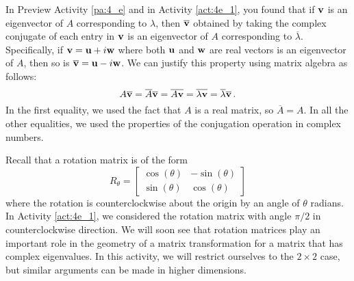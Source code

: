 In Preview Activity \ref{pa:4_e} and in Activity \ref{act:4e_1}, you found that if $\mathbf{v}$ is an eigenvector of $A$ corresponding to $\lambda$, then $\overline{\mathbf{v}}$ obtained by taking the complex conjugate of each entry in $\mathbf{v}$ is an eigenvector of $A$ corresponding to $\overline{\lambda}$. Specifically, if $\mathbf{v}=\mathbf{u}+i\mathbf{w}$ where both $\mathbf{u}$ and $\mathbf{w}$ are real vectors is an eigenvector of $A$, then so is $\overline{\mathbf{v}} = \mathbf{u}-i\mathbf{w}$. We can justify this property using matrix algebra as follows:
\[ A\overline{\mathbf{v}} = \overline{A}\overline{\mathbf{v}} = \overline{A\mathbf{v}} = \overline{\lambda \mathbf{v}} = \overline{\lambda} \overline{\mathbf{v}} \, .\]
In the first equality, we used the fact that $A$ is a real matrix, so $\overline{A}=A$. In all the other equalities, we used the properties of the conjugation operation in complex numbers.


Recall that a rotation matrix is of the form 
\[ R_\theta= \left[ \begin{array}{cr} \cos(\theta)&-\sin(\theta) \\ \sin(\theta)&\cos(\theta) \end{array} \right]\]
where the rotation is counterclockwise about the origin by an angle of $\theta$ radians. In Activity \ref{act:4e_1}, we considered the rotation matrix with angle $\pi/2$ in counterclockwise direction. We will soon see that rotation matrices play an important role in the geometry of a matrix transformation for a matrix that has complex eigenvalues. In this activity, we will restrict ourselves to the $2 \times 2$ case, but similar arguments can be made in higher dimensions.



